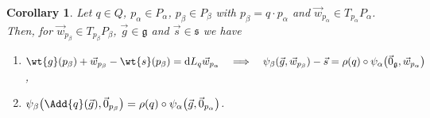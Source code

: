 \documentclass[pdftex]{sigma}
\numberwithin{equation}{section}
\newtheorem{Corollary}[Theorem]{Corollary}
\begin{document}
\begin{Corollary}
\label{cor:psialpha}
Let $q\in Q$, $p_\alpha\in P_\alpha$, $p_\beta\in P_\beta$ with $p_\beta=q\cdot p_\alpha$ and $\vec{w}_{p_\alpha}\in
T_{p_\alpha}P_\alpha$.
Then, for $\vec{w}_{p_\beta}\in T_{p_\beta}P_\beta$, $\vec{g}\in \mathfrak{g}$ and $\vec{s}\in \mathfrak{s}$ we have
\begin{enumerate}\itemsep=0pt
\item[$i)$] $\wt{g}(p_\beta) + \vec{w}_{p_\beta}-\wt{s}(p_\beta)=\mathrm{d} L_q\vec{w}_{p_\alpha}
\quad
\Longrightarrow
\quad
\psi_\beta(\vec{g},\vec{w}_{p_\beta})-\vec{s}
=\rho(q)\circ\psi_\alpha\big(\vec{0}_{\mathfrak{g}},\vec{w}_{p_\alpha}\big)$,
\item[$ii)$] $\psi_\beta\big(\Add{q}(\vec{g}),\vec{0}_{p_\beta}\big)=\rho(q)\circ
\psi_\alpha\big(\vec{g},\vec{0}_{p_\alpha}\big)$.
\end{enumerate}
\end{Corollary}
\end{document}

